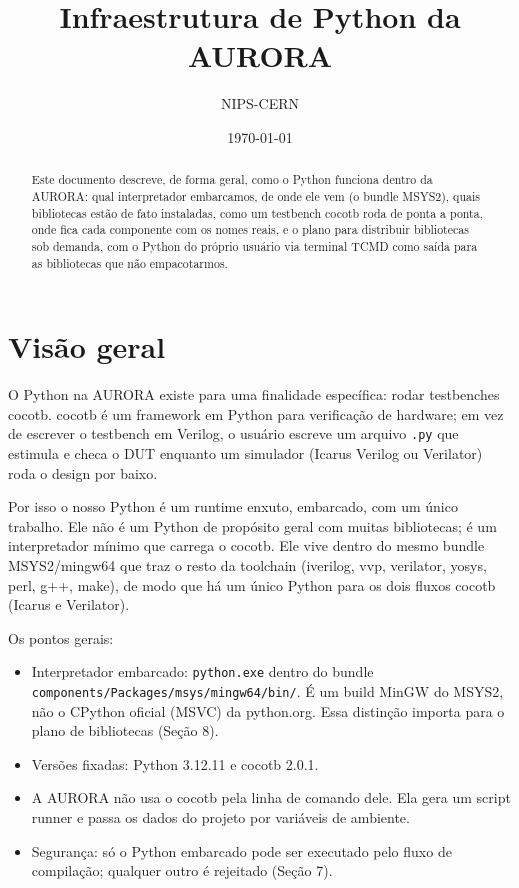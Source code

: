 \documentclass[11pt,a4paper]{article}
\title{Infraestrutura de Python da AURORA}
\author{NIPS-CERN}
\date{\today}
\begin{document}
\maketitle

\begin{abstract}
\noindent
Este documento descreve, de forma geral, como o Python funciona dentro da
AURORA: qual interpretador embarcamos, de onde ele vem (o bundle MSYS2), quais
bibliotecas estão de fato instaladas, como um testbench cocotb roda de ponta a
ponta, onde fica cada componente com os nomes reais, e o plano para distribuir
bibliotecas sob demanda, com o Python do próprio usuário via terminal TCMD como
saída para as bibliotecas que não empacotarmos.
\end{abstract}

\raggedright

\section{Visão geral}

O Python na AURORA existe para uma finalidade específica: rodar testbenches
cocotb. cocotb é um framework em Python para verificação de hardware; em vez de
escrever o testbench em Verilog, o usuário escreve um arquivo \texttt{.py} que
estimula e checa o DUT enquanto um simulador (Icarus Verilog ou Verilator) roda
o design por baixo.

Por isso o nosso Python é um runtime enxuto, embarcado, com um único trabalho.
Ele não é um Python de propósito geral com muitas bibliotecas; é um interpretador
mínimo que carrega o cocotb. Ele vive dentro do mesmo bundle MSYS2/mingw64 que
traz o resto da toolchain (iverilog, vvp, verilator, yosys, perl, g++, make), de
modo que há um único Python para os dois fluxos cocotb (Icarus e Verilator).

Os pontos gerais:

\begin{itemize}
  \item Interpretador embarcado: \texttt{python.exe} dentro do bundle
        \texttt{components/Packages/msys/mingw64/bin/}. É um build MinGW do MSYS2,
        não o CPython oficial (MSVC) da python.org. Essa distinção importa para o
        plano de bibliotecas (Seção 8).
  \item Versões fixadas: Python 3.12.11 e cocotb 2.0.1.
  \item A AURORA não usa o cocotb pela linha de comando dele. Ela gera um script
        runner e passa os dados do projeto por variáveis de ambiente.
  \item Segurança: só o Python embarcado pode ser executado pelo fluxo de
        compilação; qualquer outro é rejeitado (Seção 7).
\end{itemize}
\end{document}
